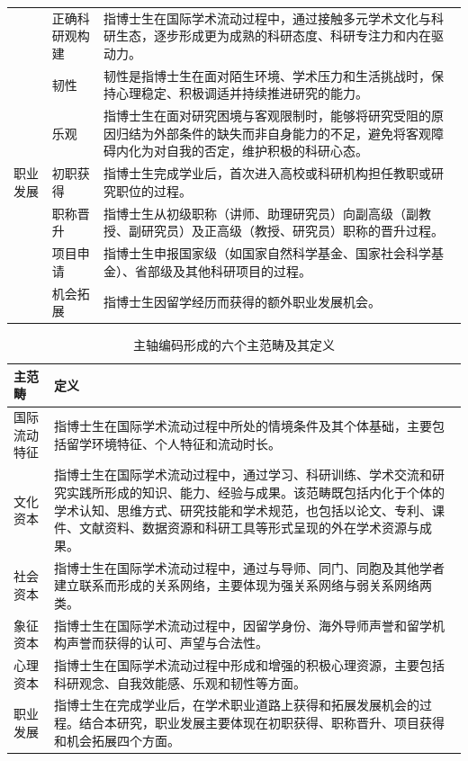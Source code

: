 {\begin{longtable}{p{2cm}p{2.5cm}p{9.5cm}}
 & 正确科研观构建 & 指博士生在国际学术流动过程中，通过接触多元学术文化与科研生态，逐步形成更为成熟的科研态度、科研专注力和内在驱动力。 \\
 & 韧性 & 韧性是指博士生在面对陌生环境、学术压力和生活挑战时，保持心理稳定、积极调适并持续推进研究的能力。 \\
 & 乐观 & 指博士生在面对研究困境与客观限制时，能够将研究受阻的原因归结为外部条件的缺失而非自身能力的不足，避免将客观障碍内化为对自我的否定，维护积极的科研心态。 \\
职业发展 & 初职获得 & 指博士生完成学业后，首次进入高校或科研机构担任教职或研究职位的过程。 \\
 & 职称晋升 & 指博士生从初级职称（讲师、助理研究员）向副高级（副教授、副研究员）及正高级（教授、研究员）职称的晋升过程。 \\
 & 项目申请 & 指博士生申报国家级（如国家自然科学基金、国家社会科学基金）、省部级及其他科研项目的过程。 \\
 & 机会拓展 & 指博士生因留学经历而获得的额外职业发展机会。 \\
\end{longtable}
}

\begin{table}[htbp]
\centering
\caption{主轴编码形成的六个主范畴及其定义}
\label{tab:axial-coding-def}
{\small
\begin{tabular}{p{2.5cm}p{11.5cm}}
\toprule
主范畴 & 定义 \\
\midrule
国际流动特征 & 指博士生在国际学术流动过程中所处的情境条件及其个体基础，主要包括留学环境特征、个人特征和流动时长。 \\
文化资本 & 指博士生在国际学术流动过程中，通过学习、科研训练、学术交流和研究实践所形成的知识、能力、经验与成果。该范畴既包括内化于个体的学术认知、思维方式、研究技能和学术规范，也包括以论文、专利、课件、文献资料、数据资源和科研工具等形式呈现的外在学术资源与成果。 \\
社会资本 & 指博士生在国际学术流动过程中，通过与导师、同门、同胞及其他学者建立联系而形成的关系网络，主要体现为强关系网络与弱关系网络两类。 \\
象征资本 & 指博士生在国际学术流动过程中，因留学身份、海外导师声誉和留学机构声誉而获得的认可、声望与合法性。 \\
心理资本 & 指博士生在国际学术流动过程中形成和增强的积极心理资源，主要包括科研观念、自我效能感、乐观和韧性等方面。 \\
职业发展 & 指博士生在完成学业后，在学术职业道路上获得和拓展发展机会的过程。结合本研究，职业发展主要体现在初职获得、职称晋升、项目获得和机会拓展四个方面。 \\
\bottomrule
\end{tabular}
}
\end{table}

